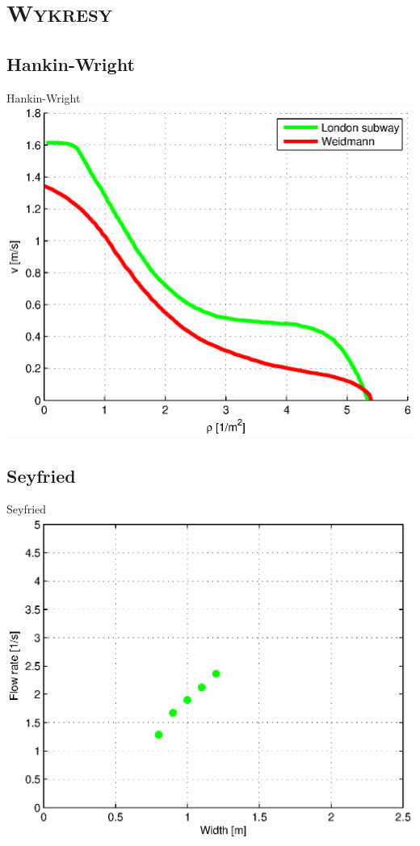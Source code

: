 \section{\scshape Wykresy}

\subsection{Hankin-Wright}
\begin{frame}{Hankin-Wright}
\includegraphics[width=\textwidth,height=0.8\textheight,keepaspectratio]{wykresy-hankin-wright}
\end{frame}

\subsection{Seyfried}
\begin{frame}{Seyfried}
\includegraphics[width=\textwidth,height=0.8\textheight,keepaspectratio]{wykresy-seyfried}
\end{frame}

